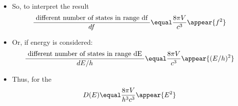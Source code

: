 \begin{frame}
\frametitle{\texorpdfstring{\culine[\sectiontitleulinecolor]{\sectiontitle}}{\sectiontitle} }

\begin{itemize}[itemsep=2.5mm]
	\item So, to interpret the result
\[
\frac{\text { different number of states in range df }}{d f}  \equal \frac{8 \pi V}{c^{3}} \appear{f^{2}}
\]
\item Or, if energy is considered:
\[
\frac{\text { different number of states in range dE }}{d E / h}  \equal \frac{8 \pi V}{c^{3}} \appear{(E / h)^{2}}
\]

\item Thus, for the  
\[
D(E)  \equal \frac{8 \pi V}{h^{3} c^{3}} \appear{E^{2}}
\]
\end{itemize}



\endofslide 
\end{frame}

